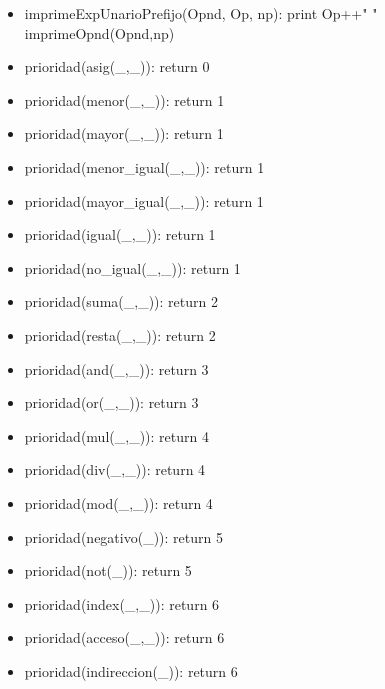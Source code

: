 \documentclass[11pt]{article}
\begin{document}
\begin{itemize}
            \item imprimeExpUnarioPrefijo(Opnd, Op, np):
                \subitem print Op++" " 
                \subitem imprimeOpnd(Opnd,np)
            
            \item prioridad(asig(\_,\_)): return 0
            \item prioridad(menor(\_,\_)): return 1
            \item prioridad(mayor(\_,\_)): return 1
            \item prioridad(menor\_igual(\_,\_)): return 1
            \item prioridad(mayor\_igual(\_,\_)): return 1
            \item prioridad(igual(\_,\_)): return 1
            \item prioridad(no\_igual(\_,\_)): return 1
            \item prioridad(suma(\_,\_)): return 2
            \item prioridad(resta(\_,\_)): return 2
            \item prioridad(and(\_,\_)): return 3
            \item prioridad(or(\_,\_)): return 3
            \item prioridad(mul(\_,\_)): return 4
            \item prioridad(div(\_,\_)): return 4
            \item prioridad(mod(\_,\_)): return 4
            \item prioridad(negativo(\_)): return 5
            \item prioridad(not(\_)): return 5
            \item prioridad(index(\_,\_)): return 6
            \item prioridad(acceso(\_,\_)): return 6
            \item prioridad(indireccion(\_)): return 6
        \end{itemize}
    
\end{document}
